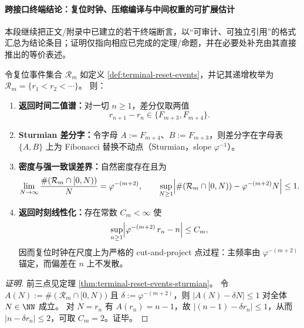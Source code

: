 \paragraph{跨接口终端结论：复位时钟、压缩编译与中间权重的可扩展估计}
本段继续把正文/附录中已建立的若干终端断言，以“可审计、可独立引用”的格式汇总为结论条目；证明仅指向相应已完成的定理/命题，并在必要处补充由其直接推出的等价表述。

\begin{conclusion}\label{con:xi-terminal-reset-bounded-remainder-clock}
令复位事件集合 \(\mathcal R_m\) 如定义 \ref{def:terminal-reset-events}，并记其递增枚举为 \(\mathcal R_m=\{r_1<r_2<\cdots\}\)。
则：
\begin{enumerate}
  \item \textbf{返回时间二值谱：}对一切 \(n\ge 1\)，差分仅取两值
  \[
  r_{n+1}-r_n\in\{F_{m+3},F_{m+4}\}.
  \]
  \item \textbf{Sturmian 差分字：}令字母 \(A:=F_{m+4}\)、\(B:=F_{m+3}\)，则差分字在字母表 \(\{A,B\}\) 上为 Fibonacci 替换不动点（Sturmian，slope \(\varphi^{-1}\)）。
  \item \textbf{密度与强一致误差界：}自然密度存在且为
  \[
  \lim_{N\to\infty}\frac{\#(\mathcal R_m\cap[0,N))}{N}=\varphi^{-(m+2)},
  \qquad
  \sup_{N\ge 1}\Bigl|\#(\mathcal R_m\cap[0,N))-\varphi^{-(m+2)}N\Bigr|\le 1.
  \]
  \item \textbf{返回时刻线性化：}存在常数 \(C_m<\infty\) 使
  \[
  \sup_{n\ge 1}\Bigl|\varphi^{-(m+2)}\,r_n-n\Bigr|\le C_m,
  \]
  因而复位时钟在尺度上为严格的 cut-and-project 点过程：主频率由 \(\varphi^{-(m+2)}\) 锚定，而偏差在 \(n\) 上不发散。
\end{enumerate}
\end{conclusion}
\begin{proof}[证明]
前三点见定理 \ref{thm:terminal-reset-events-sturmian}。
令 \(A(N):=\#(\mathcal R_m\cap[0,N))\) 且 \(\delta:=\varphi^{-(m+2)}\)，则 \(|A(N)-\delta N|\le 1\) 对全体 \(N\in\NN\) 成立。
对 \(N=r_n\) 有 \(A(r_n)=n-1\)，故 \(|(n-1)-\delta r_n|\le 1\)，从而 \(|n-\delta r_n|\le 2\)，可取 \(C_m=2\)。证毕。
\end{proof}

